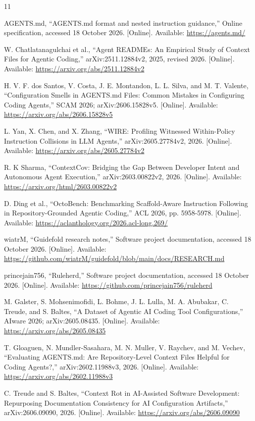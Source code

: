 \documentclass[10pt,conference]{IEEEtran}
\begin{document}
\begin{thebibliography}{11}

 AGENTS.md, ``AGENTS.md format and nested instruction guidance,'' Online specification, accessed 18 October 2026. [Online]. Available: \url{https://agents.md/}

 W. Chatlatanagulchai et al., ``Agent READMEs: An Empirical Study of Context Files for Agentic Coding,'' arXiv:2511.12884v2, 2025, revised 2026. [Online]. Available: \url{https://arxiv.org/abs/2511.12884v2}

 H. V. F. dos Santos, V. Costa, J. E. Montandon, L. L. Silva, and M. T. Valente, ``Configuration Smells in AGENTS.md Files: Common Mistakes in Configuring Coding Agents,'' SCAM 2026; arXiv:2606.15828v5. [Online]. Available: \url{https://arxiv.org/abs/2606.15828v5}

 L. Yan, X. Chen, and X. Zhang, ``WIRE: Profiling Witnessed Within-Policy Instruction Collisions in LLM Agents,'' arXiv:2605.27784v2, 2026. [Online]. Available: \url{https://arxiv.org/abs/2605.27784v2}

 R. K Sharma, ``ContextCov: Bridging the Gap Between Developer Intent and Autonomous Agent Execution,'' arXiv:2603.00822v2, 2026. [Online]. Available: \url{https://arxiv.org/html/2603.00822v2}

 D. Ding et al., ``OctoBench: Benchmarking Scaffold-Aware Instruction Following in Repository-Grounded Agentic Coding,'' ACL 2026, pp. 5958-5978. [Online]. Available: \url{https://aclanthology.org/2026.acl-long.269/}

 wiatrM, ``Guidefold research notes,'' Software project documentation, accessed 18 October 2026. [Online]. Available: \url{https://github.com/wiatrM/guidefold/blob/main/docs/RESEARCH.md}

 princejain756, ``Ruleherd,'' Software project documentation, accessed 18 October 2026. [Online]. Available: \url{https://github.com/princejain756/ruleherd}

 M. Galster, S. Mohsenimofidi, L. Bohme, J. L. Lulla, M. A. Abubakar, C. Treude, and S. Baltes, ``A Dataset of Agentic AI Coding Tool Configurations,'' AIware 2026; arXiv:2605.08435. [Online]. Available: \url{https://arxiv.org/abs/2605.08435}

 T. Gloaguen, N. Mundler-Sasahara, M. N. Muller, V. Raychev, and M. Vechev, ``Evaluating AGENTS.md: Are Repository-Level Context Files Helpful for Coding Agents?,'' arXiv:2602.11988v3, 2026. [Online]. Available: \url{https://arxiv.org/abs/2602.11988v3}

 C. Treude and S. Baltes, ``Context Rot in AI-Assisted Software Development: Repurposing Documentation Consistency for AI Configuration Artifacts,'' arXiv:2606.09090, 2026. [Online]. Available: \url{https://arxiv.org/abs/2606.09090}

\end{thebibliography}
\end{document}
